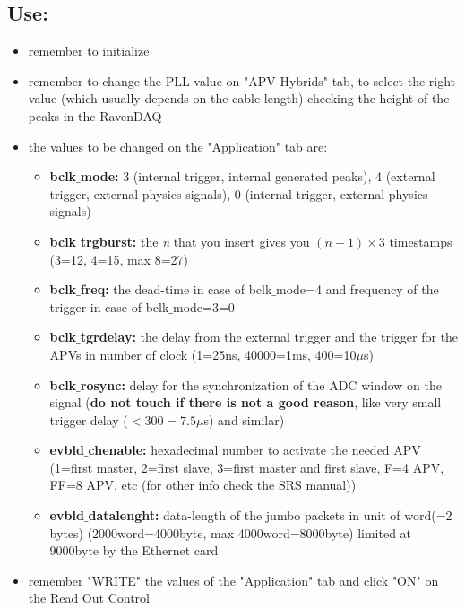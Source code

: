 \documentclass[a4paper,12pt]{article}
\begin{document}
		\subsection{Use:}
			\begin{itemize}
				\item remember to initialize
				\item remember to change the PLL value on "APV Hybrids" tab, to select the right value (which usually depends on the cable length) checking the height of the peaks in the RavenDAQ
				\item the values to be changed on the "Application" tab are:
					\begin{itemize}
						\item \textbf{bclk$\_$mode:} 3 (internal trigger, internal generated peaks), 4 (external trigger, external physics signals), 0 (internal trigger, external physics signals)
						\item \textbf{bclk$\_$trgburst:} the \textit{n} that you insert gives you $(n+1)\times3$ timestamps (3=12, 4=15, max 8=27)
						\item \textbf{bclk$\_$freq:} the dead-time in case of bclk$\_$mode=4 and frequency of the trigger in case of bclk$\_$mode=3=0
						\item \textbf{bclk$\_$tgrdelay:} the delay from the external trigger and the trigger for the APVs in number of clock (1=25ns, 40000=1ms, 400=10$\mu$s)
						\item \textbf{bclk$\_$rosync:} delay for the synchronization of the ADC window on the signal (\textbf{do not touch if there is not a good reason}, like very small trigger delay ($<300=7.5\mu$s) and similar) 
						\item \textbf{evbld$\_$chenable:} hexadecimal number to activate the needed APV (1=first master, 2=first slave, 3=first master and first slave, F=4 APV, FF=8 APV, etc (for other info check the SRS manual))
						\item \textbf{evbld$\_$datalenght:} data-length of the jumbo packets in unit of word(=2 bytes) (2000word=4000byte, max 4000word=8000byte) limited at 9000byte by the Ethernet card 
					\end{itemize}
				\item remember "WRITE" the values of the "Application" tab and click "ON" on the Read Out Control
			\end{itemize}
\end{document}
